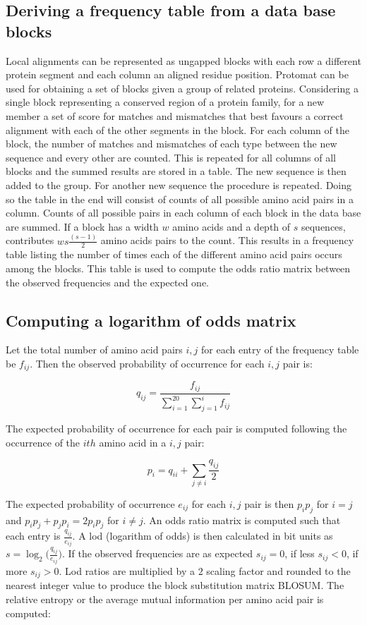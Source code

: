 	\subsection{Deriving a frequency table from a data base blocks}
	Local alignments can be represented as ungapped blocks with each row a different protein segment and each column an aligned residue position.
	Protomat can be used for obtaining a set of blocks given a group of related proteins.
	Considering a single block representing a conserved region of a protein family, for a new member a set of score for matches and mismatches that best favours a correct alignment with each of the other segments in the block.
	For each column of the block, the number of matches and mismatches of each type between the new sequence and every other are counted.
	This is repeated for all columns of all blocks and the summed results are stored in a table.
	The new sequence is then added to the group.
	For another new sequence the procedure is repeated.
	Doing so the table in the end will consist of counts of all possible amino acid pairs in a column.
	Counts of all possible pairs in each column of each block in the data base are summed.
	If a block has a width $w$ amino acids and a depth of $s$ sequences, contributes $ws\frac{(s-1)}{2}$ amino acids pairs to the count.
	This results in a frequency table listing the number of times each of the different amino acid pairs occurs among the blocks.
	This table is used to compute the odds ratio matrix between the observed frequencies and the expected one.

	\subsection{Computing a logarithm of odds matrix}
	Let the total number of amino acid pairs $i,j$ for each entry of the frequency table be $f_{ij}$.
	Then the observed probability of occurrence for each $i,j$ pair is:

	$$q_{ij} = \frac{f_{ij}}{\sum\limits_{i=1}^{20}\sum\limits_{j=1}^if_{ij}}$$

	The expected probability of occurrence for each pair is computed following the occurrence of the $ith$ amino acid in a $i,j$ pair:

	$$p_i = q_{ii}+\sum\limits_{j\neq i}\frac{q_{ij}}{2}$$

	The expected probability of occurrence $e_{ij}$ for each $i,j$ pair is then $p_ip_j$ for $i=j$ and $p_ip_j + p_jp_i = 2p_ip_j$ for $i\neq j$.
	An odds ratio matrix is computed such that each entry is $\frac{q_{ij}}{e_{ij}}$.
	A lod (logarithm of odds) is then calculated in bit units as $s = \log_2\big(\frac{q_{ij}}{e_{ij}}\big)$.
	If the observed frequencies are as expected $s_{ij} = 0$, if less $s_{ij} < 0$, if more $s_{ij} > 0$.
	Lod ratios are multiplied by a $2$ scaling factor and rounded to the nearest integer value to produce the block substitution matrix BLOSUM.
	The relative entropy or the average mutual information per amino acid pair is computed:

